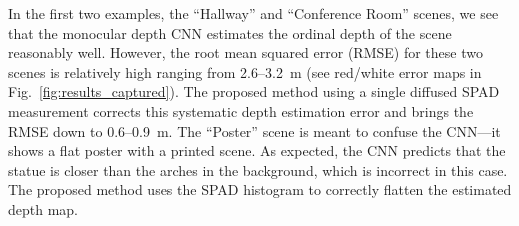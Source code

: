 In the first two examples, the ``Hallway'' and ``Conference Room'' scenes, we
see that the monocular depth CNN estimates the ordinal depth of the scene
reasonably well. However, the root mean squared error (RMSE) for these two
scenes is relatively high ranging from 2.6--3.2~m (see red/white error maps in
Fig.~\ref{fig:results_captured}). The proposed method using a single diffused
SPAD measurement corrects this systematic depth estimation error and brings the
RMSE down to 0.6--0.9~m. The ``Poster'' scene is meant to confuse the CNN---it
shows a flat poster with a printed scene. As expected, the CNN predicts that the
statue is closer than the arches in the background, which is incorrect in this
case. The proposed method uses the SPAD histogram to correctly flatten the
estimated depth map.



